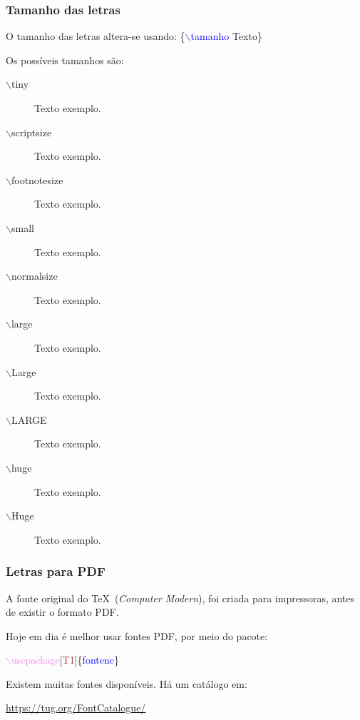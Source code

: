 \documentclass{beamer}
\begin{document}
\begin{frame}
\frametitle{Tamanho das letras}
O tamanho das letras altera-se usando:
\{\textcolor{blue}{$\backslash$tamanho} Texto\}\pause

Os possíveis tamanhos são:\pause
\begin{description}
\item[\phantom{xxxxxxiii}$\backslash$tiny] {\tiny Texto exemplo.}\pause
\item[\phantom{xxi}$\backslash$scriptsize] {\scriptsize Texto exemplo.}\pause
\item[$\backslash$footnotesize] {\footnotesize Texto exemplo.}\pause
\item[\phantom{xxxxxx}$\backslash$small] {\small Texto exemplo.}\pause
\item[\phantom{xi}$\backslash$normalsize] {\normalsize Texto exemplo.}\pause
\item[\phantom{xxxxxxi}$\backslash$large] {\large Texto exemplo.}\pause
\item[\phantom{xxxxxx}$\backslash$Large] {\Large Texto exemplo.}\pause
\item[\phantom{xxxxx}$\backslash$LARGE] {\LARGE Texto exemplo.}\pause
\item[\phantom{xxxxxxi}$\backslash$huge] {\huge Texto exemplo.}\pause
\item[\phantom{xxxxxxi}$\backslash$Huge] {\Huge Texto exemplo.}
\end{description}
\end{frame}
\begin{frame}
\frametitle{Letras para PDF}
A fonte original do \TeX\ (\emph{Computer Modern}), foi criada para
impressoras, antes de existir o formato PDF.

Hoje em dia é melhor usar fontes PDF, por meio do pacote:

\qquad\textcolor{violet}{$\backslash$usepackage}[\textcolor{brown}{T1}]\{\textcolor{blue}{fontenc}\}\pause

Existem muitas fontes disponíveis. Há um catálogo em:

\qquad\url{https://tug.org/FontCatalogue/}
\end{frame}
\end{document}
